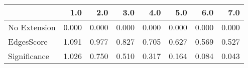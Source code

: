 \begin{tabular}{lrrrrrrr}
\toprule
{} &   1.0 &   2.0 &   3.0 &   4.0 &   5.0 &   6.0 &   7.0 \\
\midrule
No Extension & 0.000 & 0.000 & 0.000 & 0.000 & 0.000 & 0.000 & 0.000 \\
EdgesScore   & 1.091 & 0.977 & 0.827 & 0.705 & 0.627 & 0.569 & 0.527 \\
Significance & 1.026 & 0.750 & 0.510 & 0.317 & 0.164 & 0.084 & 0.043 \\
\bottomrule
\end{tabular}
